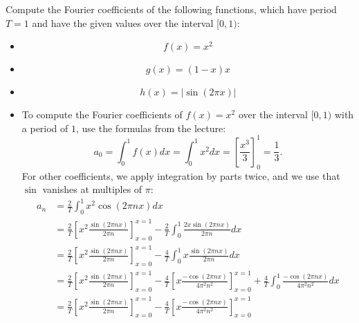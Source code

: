 \documentclass[11pt]{article}
\begin{document}
\begin{exercise}
    Compute the Fourier coefficients of the following functions, which have period $T = 1$ and have the given values over the interval $[0,1)$:
    \begin{itemize}
     \item 
     \[
        f(x) = x^{2}
     \]
     \item 
     \[
        g(x) = (1-x)x
     \]
     \item 
     \[
        h(x) = |\sin( 2 \pi x )|
     \]
    \end{itemize}
\end{exercise}
\begin{solution}     
    \begin{itemize}
        \item 
        To compute the Fourier coefficients of $f(x) = x^2$ over the interval $[0,1)$ with a period of $1$, use the formulas from the lecture:
        \[
            a_0 = \int_{0}^{1} f(x) dx  = \int_{0}^{1} x^2 dx  = \left[ \frac{x^3}{3} \right]_{0}^{1} = \frac 1 3.
        \]
        For other coefficients, we apply integration by parts twice, and we use that $\sin$ vanishes at multiples of $\pi$:
        \begin{align*}
            a_n 
            &
            = 
            \frac{2}{T}
            \int_{0}^{1} x^2 \cos(2\pi n x) dx
            \\&
            =
            \frac{2}{T}
            \left[ x^2 \frac{ \sin(2\pi n x) }{ 2\pi n } \right]_{x=0}^{x=1}
            -
            \frac{2}{T}
            \int_{0}^{1} \frac{ 2x \sin(2\pi n x) }{ 2\pi n } dx
            \\&
            =
            \frac{2}{T}
            \left[ x^2 \frac{ \sin(2\pi n x) }{ 2\pi n } \right]_{x=0}^{x=1}
            -
            \frac{4}{T}
            \int_{0}^{1} x \frac{ \sin(2\pi n x) }{ 2\pi n } dx
            \\&
            =
            \frac{2}{T}
            \left[ x^2 \frac{ \sin(2\pi n x) }{ 2\pi n } \right]_{x=0}^{x=1}
            -
            \frac{4}{T}
            \left[ x \frac{ -\cos(2\pi n x) }{ 4\pi^2 n^2 } \right]_{x=0}^{x=1}
            +
            \frac{4}{T}
            \int_{0}^{1} \frac{ -\cos(2\pi n x) }{ 4\pi^2 n^2 } dx
            \\&
            =
            \frac{2}{T}
            \left[ x^2 \frac{ \sin(2\pi n x) }{ 2\pi n } \right]_{x=0}^{x=1}
            -
            \frac{4}{T}
            \left[ x \frac{ -\cos(2\pi n x) }{ 4\pi^2 n^2 } \right]_{x=0}^{x=1}

\end{align*}
\end{itemize}
\end{solution}
\end{document}
